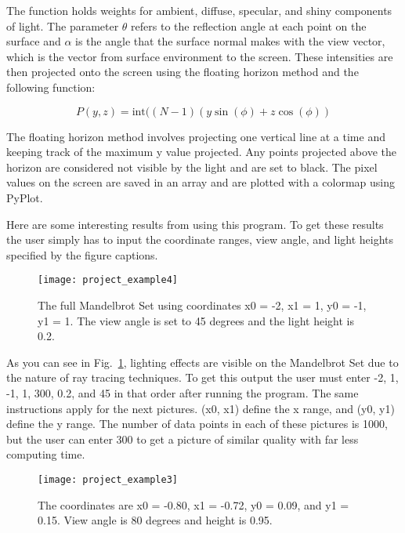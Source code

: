\documentclass[12pt]{article}
\begin{document}
\indent
The function holds weights for ambient, diffuse, specular, and 
shiny components of light. The parameter \(\theta \) refers to the 
reflection angle at each point on the surface and \(\alpha \) is 
the angle that the surface normal makes with the view vector, 
which is the vector from surface environment to the screen. These 
intensities are then projected onto the screen using the floating 
horizon method and the following function:

   \[ P(y, z) = \text{int}((N - 1)(y\sin(\phi) + z\cos(\phi)) \]

\vspace*{5bp}

The floating horizon method involves projecting one vertical line 
at a time and keeping track of the maximum y value projected. Any 
points projected above the horizon are considered not visible by 
the light and are set to black. The pixel values on the screen are 
saved in an array and are plotted with a colormap using PyPlot.
 
\vspace*{10bp}
\newpage
\indent
Here are some interesting results from using this program. To get 
these results the user simply has to input the coordinate ranges, 
view angle, and light heights specified by the figure captions.

\begin{figure}[h]
\texttt{[image: project\_example4]}
\vspace{-18bp}
\caption[]{\label{fig:4}\small
The full Mandelbrot Set using coordinates x0 = -2, x1 = 1, y0 = -1, 
y1 = 1. The view angle is set to 45 degrees and the light height is 
0.2.
}
\end{figure}
As you can see in Fig.~\ref{fig:4}, lighting effects are visible on 
the Mandelbrot Set due to the nature of ray tracing techniques. To 
get this output the user must enter -2, 1, -1, 1, 300, 0.2, and 45 
in that order after running the program. The same instructions apply 
for the next pictures. (x0, x1) define the x range, and (y0, y1) 
define the y range. The number of data points in each of these pictures 
is 1000, but the user can enter 300 to get a picture of similar quality 
with far less computing time. 

\begin{figure}[h]
\texttt{[image: project\_example3]}
\vspace{-18bp}
\caption[]{\label{fig:3}\small
The coordinates are x0 = -0.80, x1 = -0.72, y0 = 0.09, and y1 = 0.15. 
View angle is 80 degrees and height is 0.95.
}
\end{figure}
\end{document}
